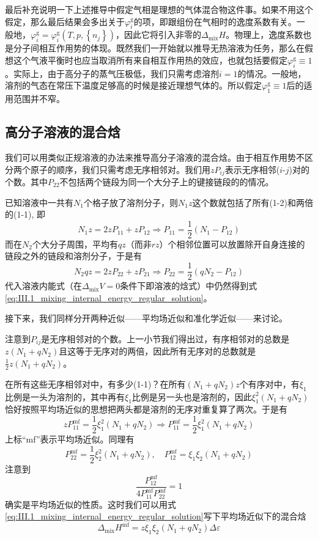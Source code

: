 \documentclass[main.tex]{subfiles}
\begin{document}
最后补充说明一下上述推导中假定气相是理想的气体混合物这件事。如果不用这个假定，那么最后结果会多出关于$\varphi_i^\text{g}$的项，即跟组份在气相时的逸度系数有关。一般地，$\varphi_i^\text{g}=\varphi_i^\text{g}\left(T,p,\left\{n_j\right\}\right)$，因此它将引入非零的$\Delta_\text{mix}H$。物理上，逸度系数也是分子间相互作用势的体现。既然我们一开始就以推导无热溶液为任务，那么在假想这个气液平衡时也应当取消所有来自相互作用热的效应，也就包括要假定$\varphi_i^\text{g}\equiv 1$。实际上，由于高分子的蒸气压极低，我们只需考虑溶剂$i=1$的情况。一般地，溶剂的气态在常压下温度足够高的时候是接近理想气体的。所以假定$\varphi_1^\text{g}\equiv 1$后的适用范围并不窄。

\subsection{高分子溶液的混合焓}
我们可以用类似正规溶液的办法来推导高分子溶液的混合焓。由于相互作用势不区分两个原子的顺序，我们只需考虑无序相邻对。我们用$zP_{ij}$表示无序相邻($i$-$j$)对的个数。其中$P_{22}$不包括两个链段为同一个大分子上的键接链段的的情况。

已知溶液中一共有$N_1$个格子放了溶剂分子，则$N_1z$这个数就包括了所有(1-2)和两倍的(1-1), 即
\[N_1z=2zP_{11}+zP_{12}\Rightarrow P_{11}=\frac{1}{2}\left(N_1-P_{12}\right)\]
而在$N_2$个大分子周围，平均有$qz$（而非$rz$）个相邻位置可以放置除开自身连接的链段之外的链段和溶剂分子，于是有
\[N_2qz=2zP_{22}+zP_{21}\Rightarrow P_{22}=\frac{1}{2}\left(qN_2-P_{12}\right)\]
代入溶液内能式（在$\Delta_\text{mix}V=0$条件下即溶液的焓式）中仍然得到式\eqref{eq:III.1_mixing_internal_energy_regular_solution}。

接下来，我们同样分开两种近似——平均场近似和准化学近似——来讨论。

注意到$P_{ij}$是无序相邻对的个数。上一小节我们得出过，有序相邻对的总数是$z\left(N_1+qN_2\right)$且这等于无序对的两倍，因此所有无序对的总数就是$\frac{1}{2}z\left(N_1+qN_2\right)$。

在所有这些无序相邻对中，有多少(1-1)？在所有$\left(N_1+qN_2\right)z$个有序对中，有$\xi_1$比例是一头为溶剂的，其中再有$\xi_1$比例是另一头也是溶剂的，因此$\xi_1^2\left(N_1+qN_2\right)$恰好按照平均场近似的思想把两头都是溶剂的无序对重复算了两次。于是有
\[zP_{11}^\text{mf}=\frac{1}{2}\xi_1^2\left(N_1+qN_2\right)\Rightarrow P_{11}^\text{mf}=\frac{1}{2}\xi_1^2\left(N_1+qN_2\right)\]
上标“mf”表示平均场近似。同理有
\[P_{22}^\text{mf}=\frac{1}{2}\xi_2^2\left(N_1+qN_2\right),\quad P_{12}^\text{mf}=\xi_1\xi_2\left(N_1+qN_2\right)\]
注意到
\[\frac{P_{12}^\text{mf}}{4P_{11}^\text{mf}P_{22}^\text{mf}}=1\]
确实是平均场近似的性质。这时我们可以用式\eqref{eq:III.1_mixing_internal_energy_regular_solution}写下平均场近似下的混合焓
\begin{equation}\label{eq:III.3_polymer_solution_mixing_enthalpy_mf}\Delta_\text{mix}H^\text{mf}=z\xi_1\xi_2\left(N_1+qN_2\right)\Delta\varepsilon\end{equation}
\end{document}
